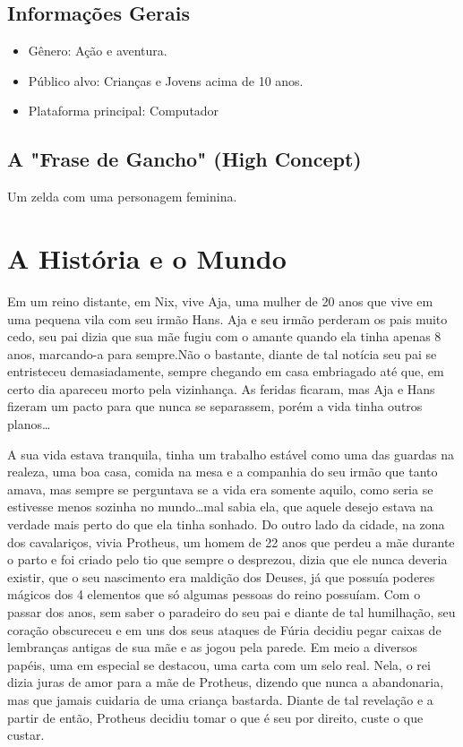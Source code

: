 \documentclass[12pt, a4paper]{article} %
\begin{document}
	\subsection{Informações Gerais}
	
	\begin{itemize}
		\item Gênero: Ação e aventura. 
		\item Público alvo: Crianças e Jovens acima de 10 anos. 
		\item Plataforma principal: Computador
	\end{itemize}
	
	\subsection{A "Frase de Gancho" (High Concept)}
	
	Um zelda com uma personagem feminina.
	
	\newpage
	
	
	\section{A História e o Mundo}
	
	Em um reino distante, em Nix, vive Aja, uma mulher de 20 anos que vive em uma pequena vila com seu irmão Hans. Aja e seu irmão perderam os pais muito cedo, seu pai dizia que sua mãe fugiu com o amante quando ela tinha apenas 8 anos, marcando-a para sempre.Não o bastante, diante de tal notícia seu pai se entristeceu demasiadamente, sempre chegando em casa embriagado até que, em certo dia apareceu morto pela vizinhança. As feridas ficaram, mas Aja e Hans fizeram um pacto para que nunca se separassem, porém a vida tinha outros planos…
	
	A sua vida estava tranquila, tinha um trabalho estável como uma das guardas na realeza, uma boa casa, comida na mesa e a companhia do seu irmão que tanto amava, mas sempre se perguntava se a vida era somente aquilo, como seria se estivesse menos sozinha no mundo…mal sabia ela, que aquele desejo estava na verdade mais perto do que ela tinha sonhado. Do outro lado da cidade, na zona dos cavalariços, vivia Protheus, um homem de 22 anos que perdeu a mãe durante o parto e foi criado pelo tio que sempre o desprezou, dizia que ele nunca deveria existir, que o seu nascimento era maldição dos Deuses, já que possuía poderes mágicos dos 4 elementos que só algumas pessoas do reino possuíam. Com o passar dos anos, sem saber o paradeiro do seu pai e diante de tal humilhação, seu coração obscureceu e em uns dos seus ataques de Fúria decidiu pegar caixas de lembranças antigas de sua mãe e as jogou pela parede. Em meio a diversos papéis, uma em especial se destacou, uma carta com um selo real. Nela, o rei dizia juras de amor para a mãe de Protheus, dizendo que nunca a abandonaria, mas que jamais cuidaria de uma criança bastarda. Diante de tal revelação e a partir de então, Protheus decidiu tomar o que é seu por direito, custe o que custar.
	
\end{document}
